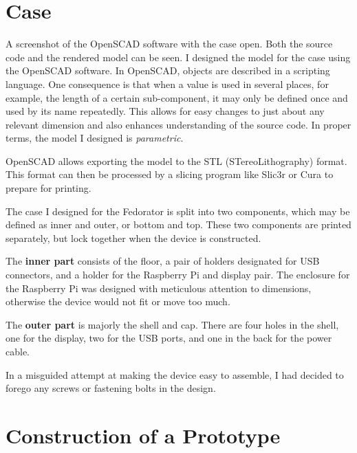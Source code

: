     \section{Case}
            {A screenshot of the OpenSCAD software with the case open.  Both the source code and the rendered model can be seen.}
        I designed the model for the case using the OpenSCAD software.  In OpenSCAD, objects are described in a scripting language.  One consequence is that when a value is used in several places, for example, the length of a certain sub-component, it may only be defined once and used by its name repeatedly.  This allows for easy changes to just about any relevant dimension and also enhances understanding of the source code.  In proper terms, the model I designed is \textit{parametric}.
        
        OpenSCAD allows exporting the model to the STL (STereoLithography) format.  This format can then be processed by a slicing program like Slic3r or Cura to prepare for printing.
        
        The case I designed for the Fedorator is split into two components, which may be defined as inner and outer, or bottom and top.  These two components are printed separately, but lock together when the device is constructed.
        
        The \textbf{inner part} consists of the floor, a pair of holders designated for USB connectors, and a holder for the Raspberry Pi and display pair.  The enclosure for the Raspberry Pi was designed with meticulous attention to dimensions, otherwise the device would not fit or move too much.
        
        The \textbf{outer part} is majorly the shell and cap.  There are four holes in the shell, one for the display, two for the USB ports, and one in the back for the power cable.
        
        In a misguided attempt at making the device easy to assemble, I had decided to forego any screws or fastening bolts in the design.
        
        
    \section{Construction of a Prototype}
        \blind[3]
